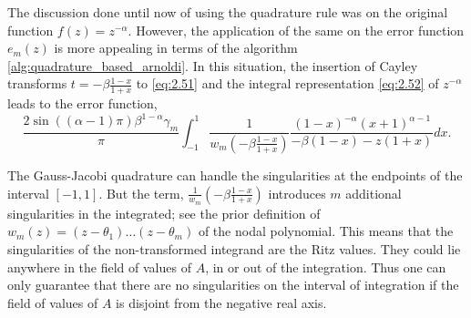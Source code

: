The discussion done until now of using the quadrature rule was on the original function $f(z)=z^{-\alpha}$. However, the application of the same on the error function $e_{m}(z)$ is more appealing in terms of the algorithm \ref{alg:quadrature_based_arnoldi}. In this situation, the insertion of Cayley transforms $t= -\beta \frac{1-x}{1+x}$ to \eqref{eq:2.51} and the integral representation \eqref{eq:2.52} of $z^{-\alpha}$ leads to the error function,
\begin{equation}
    \frac{2 \sin((\alpha - 1)\pi) \beta^{1 - \alpha} \gamma_{m}}{\pi} \int_{-1}^{1} \frac{1}{w_{m}\left( -\beta \frac{1 - x}{1 + x} \right)}\frac{(1 - x)^{-\alpha} (x + 1)^{\alpha - 1}}{- \beta (1 - x) - z(1 + x)}dx.
    \label{eq:2.56}
\end{equation}

The Gauss-Jacobi quadrature can handle the singularities at the endpoints of the interval $[-1,1]$. But the term, $\frac{1}{w_{m}}(-\beta\frac{1-x}{1+x})$ introduces $m$ additional singularities in the integrated; see the prior definition of $w_{m}(z)=(z-\theta_{1})\dots(z-\theta_{m})$ of the nodal polynomial. This means that the singularities of the non-transformed integrand are the Ritz values. They could lie anywhere in the field of values of $A$, in or out of the integration. Thus one can only guarantee that there are no singularities on the interval of integration if the field of values of $A$ is disjoint from the negative real axis.